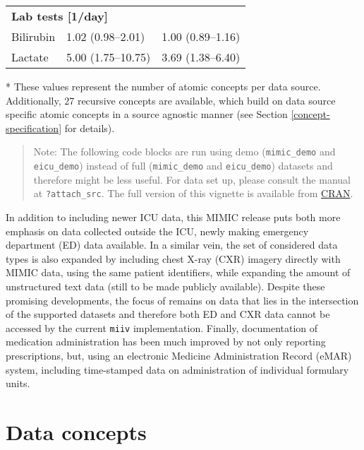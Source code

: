 \documentclass[
  notitle,
  nojss,
  noheadings]{jss}
\begin{document}
\begin{table}
\begin{threeparttable}
\begin{tabular}[t]{lll}
\multicolumn{3}{l}{\textbf{Lab tests [1/day]}}\\
\hspace{1em}Bilirubin & 1.02 (0.98--2.01) & 1.00 (0.89--1.16)\\
\hspace{1em}Lactate & 5.00 (1.75--10.75) & 3.69 (1.38--6.40)\\
\bottomrule
\end{tabular}
\begin{tablenotes}
\item[*] These values represent the number of atomic concepts per data source. Additionally, 27 recursive concepts are available, which build on data source specific atomic concepts in a source agnostic manner (see Section \ref{concept-specification} for details).
\end{tablenotes}
\end{threeparttable}
\end{table}

\begin{quote}
Note: The following code blocks are run using demo (\texttt{mimic\_demo}
and \texttt{eicu\_demo}) instead of full (\texttt{mimic\_demo} and
\texttt{eicu\_demo}) datasets and therefore might be less useful. For
data set up, please consult the manual at \texttt{?attach\_src}. The
full version of this vignette is available from
\href{https://CRAN.R-project.org/package=ricu/vignettes/jss.pdf}{CRAN}.
\end{quote}

In addition to including newer ICU data, this MIMIC release puts both
more emphasis on data collected outside the ICU, newly making emergency
department (ED) data available. In a similar vein, the set of considered
data types is also expanded by including chest X-ray (CXR) imagery
directly with MIMIC data, using the same patient identifiers, while
expanding the amount of unstructured text data (still to be made
publicly available). Despite these promising developments, the focus of
 remains on data that lies in the intersection of the
supported datasets and therefore both ED and CXR data cannot be accessed
by the current \texttt{miiv} implementation. Finally, documentation of
medication administration has been much improved by not only reporting
prescriptions, but, using an electronic Medicine Administration Record
(eMAR) system, including time-stamped data on administration of
individual formulary units.

\hypertarget{data-concepts}{%
\section{Data concepts}\label{data-concepts}}
\end{document}
